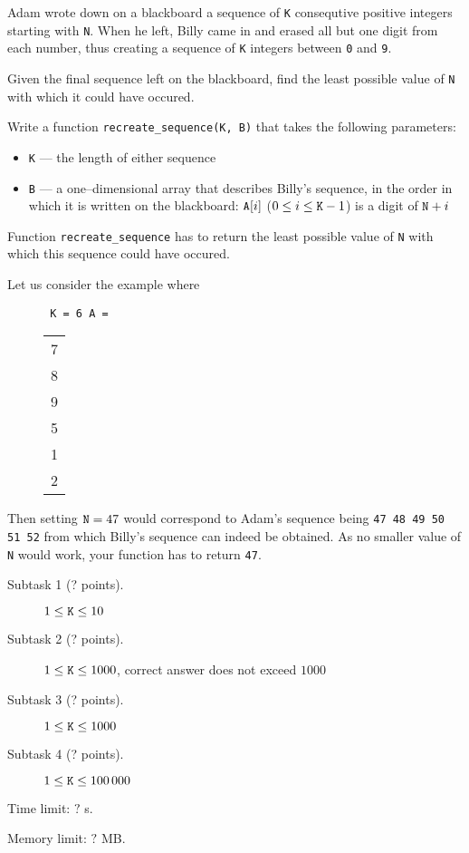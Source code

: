\documentclass{../../../latex/boi2014}
\newcommand{\param}[1]{{\tt #1}}
\newcommand{\method}[1]{{\tt #1}}
\newcommand{\constant}[1]{{\tt #1}}
\begin{document}
    Adam wrote down on a blackboard a sequence of \param{K} consequtive
    positive integers starting with \param{N}. When he left, Billy came
    in and erased all but one digit from each number, thus creating a
    sequence of \param{K} integers between \constant{0} and \constant{9}.

    \Task

    Given the final sequence left on the blackboard, find the least
    possible value of \param{N} with which it could have occured.

    \Implementation

    Write a function \method{recreate\_sequence(K, B)} that takes
    the following parameters:
    \begin{itemize}
        \item \param{K} --- the length of either sequence
        \item \param{B} --- a one--dimensional array that describes
                            Billy's sequence, in the order in which
                            it is written on the blackboard: $\param{A}[i]$
                            ($0 \le i \le \param{K}-1$) is a digit
                            of $\param{N}+i$
    \end{itemize}

    Function \method{recreate\_sequence} has to return the least possible
    value of \param{N} with which this sequence could have occured.

    \Example

    Let us consider the example where
    \begin{figure}[H]
        \centering
        \constant{%
            \param{K} = 6
            \;
            \param{A} =%
            \begin{tabular}{c}
                7\\8\\9\\5\\1\\2
            \end{tabular}
        }
    \end{figure}

    Then setting $\param{N}=47$ would correspond to Adam's sequence
    being \constant{47 48 49 50 51 52} from which Billy's sequence
    can indeed be obtained. As no smaller value of \param{N}
    would work, your function has to return \constant{47}.

\Scoring

\begin{description}
    \item[Subtask 1 (? points).] $1 \le \param{K} \le 10$
    \item[Subtask 2 (? points).] $1 \le \param{K} \le 1000$, correct
        answer does not exceed $1000$
    \item[Subtask 3 (? points).] $1 \le \param{K} \le 1000$
    \item[Subtask 4 (? points).] $1 \le \param{K} \le 100\,000$
\end{description}

\Constraints

Time limit: $?$ s.

Memory limit: $?$ MB.
\end{document}
